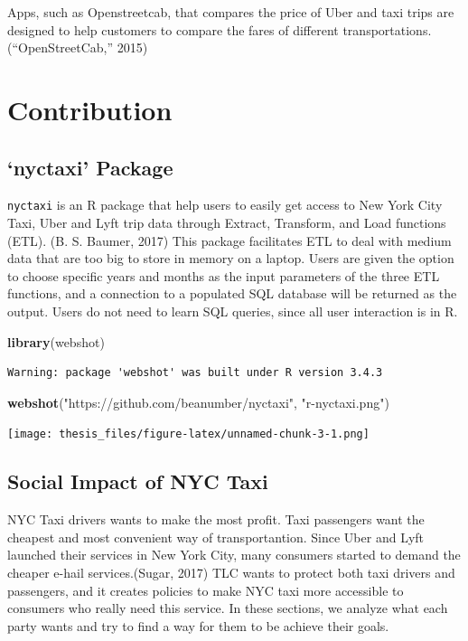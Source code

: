 \documentclass[12pt,twoside]{reedthesis}
\newenvironment{Shaded}{\begin{snugshade}}{\end{snugshade}}
\newcommand{\KeywordTok}[1]{\textcolor[rgb]{0.13,0.29,0.53}{\textbf{#1}}}
\newcommand{\StringTok}[1]{\textcolor[rgb]{0.31,0.60,0.02}{#1}}
\newcommand{\NormalTok}[1]{#1}
\theoremstyle{definition}
\theoremstyle{definition}
\theoremstyle{definition}
\theoremstyle{remark}
\begin{document}
Apps, such as Openstreetcab, that compares the price of Uber and taxi
trips are designed to help customers to compare the fares of different
transportations. (``OpenStreetCab,'' 2015)

\section{Contribution}\label{contribution}

\subsection{\texorpdfstring{`nyctaxi'
Package}{nyctaxi Package}}\label{nyctaxi-package}

\texttt{nyctaxi} is an R package that help users to easily get access to
New York City Taxi, Uber and Lyft trip data through Extract, Transform,
and Load functions (ETL). (B. S. Baumer, 2017) This package facilitates
ETL to deal with medium data that are too big to store in memory on a
laptop. Users are given the option to choose specific years and months
as the input parameters of the three ETL functions, and a connection to
a populated SQL database will be returned as the output. Users do not
need to learn SQL queries, since all user interaction is in R.
\begin{Shaded}
\begin{Highlighting}[]
\KeywordTok{library}\NormalTok{(webshot)}
\end{Highlighting}
\end{Shaded}
\begin{verbatim}
Warning: package 'webshot' was built under R version 3.4.3
\end{verbatim}
\begin{Shaded}
\begin{Highlighting}[]
\KeywordTok{webshot}\NormalTok{(}\StringTok{"https://github.com/beanumber/nyctaxi"}\NormalTok{, }\StringTok{"r-nyctaxi.png"}\NormalTok{)}
\end{Highlighting}
\end{Shaded}
\texttt{[image: thesis\_files/figure-latex/unnamed-chunk-3-1.png]}

\subsection{Social Impact of NYC Taxi}\label{social-impact-of-nyc-taxi}

NYC Taxi drivers wants to make the most profit. Taxi passengers want the
cheapest and most convenient way of transportantion. Since Uber and Lyft
launched their services in New York City, many consumers started to
demand the cheaper e-hail services.(Sugar, 2017) TLC wants to protect
both taxi drivers and passengers, and it creates policies to make NYC
taxi more accessible to consumers who really need this service. In these
sections, we analyze what each party wants and try to find a way for
them to be achieve their goals.
\end{document}
